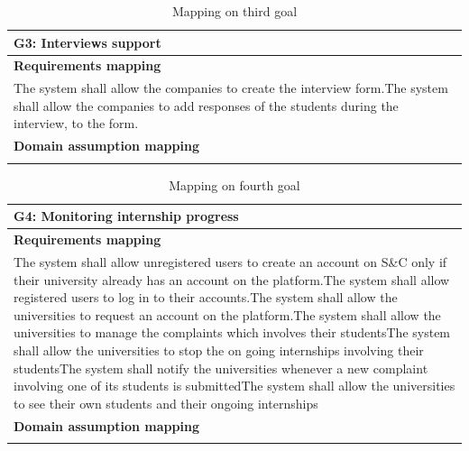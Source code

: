 \documentclass{article}
\begin{document}
\begin{table}[H]
    \centering
    \begin{tabular}{|p{11cm}|}
        \hline
         G3: Interviews support\\
         \hline
         \textbf{Requirements mapping}\\
         \hline
        [R13] The system shall allow the companies to create the interview form.\newline
        [R14] The system shall allow the companies to add responses of the students during the interview, to the form.\newline \\
         \hline
         \textbf{Domain assumption mapping}\\
         \hline
         \\
         \hline
    \end{tabular}
    \caption{Mapping on third goal}
    \label{tab:my_label}
\end{table}

\begin{table}[H]
    \centering
    \begin{tabular}{|p{11cm}|}
        \hline
         G4: Monitoring internship progress \\
         \hline
         \textbf{Requirements mapping}\\
         \hline
        [R1] The system shall allow unregistered users to create an account on S\&C only if their university already has an account on the platform.\newline
        [R2] The system shall allow registered users to log in to their accounts.\newline
        [R3] The system shall allow the universities to request an account on the platform.\newline
        [R15] The system shall allow the universities to manage the complaints which involves their students\newline
        [R16] The system shall allow the universities to stop the on going internships involving their students\newline
        [R25] The system shall notify the universities whenever a new complaint involving one of its students is submitted\newline
        [R32] The system shall allow the universities to see their own students and their ongoing internships\newline\\
         \hline
         \textbf{Domain assumption mapping}\\
         \hline
         \\
         \hline
    \end{tabular}
    \caption{Mapping on fourth goal}
    \label{tab:my_label}
\end{table}
\end{document}
